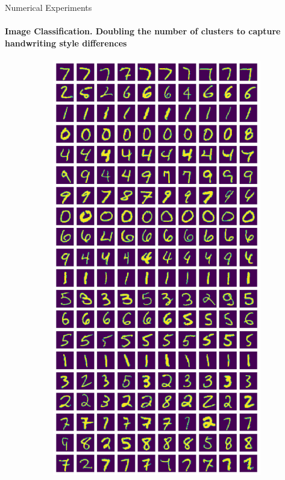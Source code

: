 \documentclass[10pt,a4paper, nocenter]{beamer}
\begin{document}
	\begin{frame}{Numerical Experiments}
		\framesubtitle{Image Classification. Doubling the number of clusters to capture handwriting style differences}
		\begin{figure}[h]
			\begin{center}
				\begin{subfigure}[b]{0.4\textwidth}
					\centering
					\includegraphics[height={0.6\textheight}]{../../images/number_clustering.png}

\end{subfigure}
\end{center}
\end{figure}
\end{frame}
\end{document}
